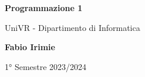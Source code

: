\begin{titlepage}
	\begin{center}
		\vspace*{1cm}

		\Huge
		\textbf{Programmazione 1}

		\vspace{0.5cm}
		\LARGE
		UniVR - Dipartimento di Informatica

		\vspace{1.5cm}

		\textbf{Fabio Irimie}

		\vfill


		\vspace{0.8cm}


		1° Semestre 2023/2024

	\end{center}
\end{titlepage}
